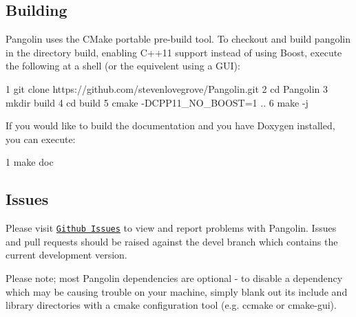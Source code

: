 \subsection*{Building}

Pangolin uses the C\+Make portable pre-\/build tool. To checkout and build pangolin in the directory \textquotesingle{}build\textquotesingle{}, enabling C++11 support instead of using Boost, execute the following at a shell (or the equivelent using a G\+UI)\+:


\begin{DoxyCode}
1 git clone https://github.com/stevenlovegrove/Pangolin.git
2 cd Pangolin
3 mkdir build
4 cd build
5 cmake -DCPP11\_NO\_BOOST=1 ..
6 make -j
\end{DoxyCode}


If you would like to build the documentation and you have Doxygen installed, you can execute\+:


\begin{DoxyCode}
1 make doc
\end{DoxyCode}


\subsection*{Issues}

Please visit \href{https://github.com/stevenlovegrove/Pangolin/issues}{\tt Github Issues} to view and report problems with Pangolin. Issues and pull requests should be raised against the devel branch which contains the current development version.

Please note; most Pangolin dependencies are optional -\/ to disable a dependency which may be causing trouble on your machine, simply blank out it\textquotesingle{}s include and library directories with a cmake configuration tool (e.\+g. ccmake or cmake-\/gui). 